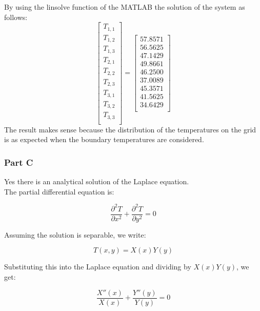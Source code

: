 \documentclass[12pt, a4paper]{article}
\begin{document}
By using the linsolve function of the MATLAB the solution of the system as follows:
\begin{equation}
\begin{bmatrix}
T_{1,1}\\
T_{1,2}\\
T_{1,3}\\
T_{2,1}\\
T_{2,2}\\
T_{2,3}\\
T_{3,1}\\
T_{3,2}\\
T_{3,3}\\
\end{bmatrix}=
\begin{bmatrix}
57.8571\\
56.5625\\
47.1429\\
49.8661\\
46.2500\\
37.0089\\
45.3571\\
41.5625\\
34.6429\\
\end{bmatrix}
\end{equation}
The result makes sense because the distribution of the temperatures on the grid is as expected when the boundary temperatures are considered.
\subsubsection{Part C}
Yes there is an analytical solution of the Laplace equation.\\
The partial differential equation is:

\begin{equation}
\frac{\partial^2 T}{\partial x^2} + \frac{\partial^2 T}{\partial y^2} = 0
\end{equation}

Assuming the solution is separable, we write:

\begin{equation}
T(x,y) = X(x)Y(y)
\end{equation}

Substituting this into the Laplace equation and dividing by $X(x)Y(y)$, we get:

\begin{equation}
\frac{X''(x)}{X(x)} + \frac{Y''(y)}{Y(y)} = 0
\end{equation}
\end{document}
